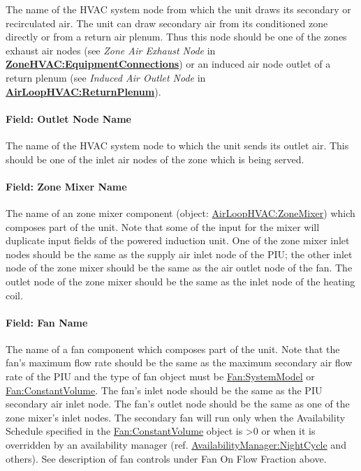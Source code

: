 The name of the HVAC system node from which the unit draws its secondary or recirculated air. The unit can draw secondary air from its conditioned zone directly or from a return air plenum. Thus this node should be one of the zones exhaust air nodes (see \emph{Zone Air Exhaust Node} in \textbf{\hyperref[zonehvacequipmentconnections]{ZoneHVAC:EquipmentConnections}}) or an induced air node outlet of a return plenum (see \emph{Induced Air Outlet Node} in \textbf{\hyperref[airloophvacreturnplenum]{AirLoopHVAC:ReturnPlenum}}).

\paragraph{Field: Outlet Node Name}\label{field-outlet-node-name-1}

The name of the HVAC system node to which the unit sends its outlet air. This should be one of the inlet air nodes of the zone which is being served.

\paragraph{Field: Zone Mixer Name}\label{field-zone-mixer-name-1}

The name of an zone mixer component (object: \hyperref[airloophvaczonemixer]{AirLoopHVAC:ZoneMixer}) which composes part of the unit. Note that some of the input for the mixer will duplicate input fields of the powered induction unit. One of the zone mixer inlet nodes should be the same as the supply air inlet node of the PIU; the other inlet node of the zone mixer should be the same as the air outlet node of the fan. The outlet node of the zone mixer should be the same as the inlet node of the heating coil.

\paragraph{Field: Fan Name}\label{field-fan-name-2}

The name of a fan component which composes part of the unit. Note that the fan's maximum flow rate should be the same as the maximum secondary air flow rate of the PIU and the type of fan object must be \hyperref[fansystemmodel]{Fan:SystemModel} or \hyperref[fanconstantvolume]{Fan:ConstantVolume}. The fan's inlet node should be the same as the PIU secondary air inlet node. The fan's outlet node should be the same as one of the zone mixer's inlet nodes. The secondary fan will run only when the Availability Schedule specified in the \hyperref[fanconstantvolume]{Fan:ConstantVolume} object is >0 or when it is overridden by an availability manager (ref. \hyperref[availabilitymanagernightcycle]{AvailabilityManager:NightCycle} and others). See description of fan controls under Fan On Flow Fraction above.

